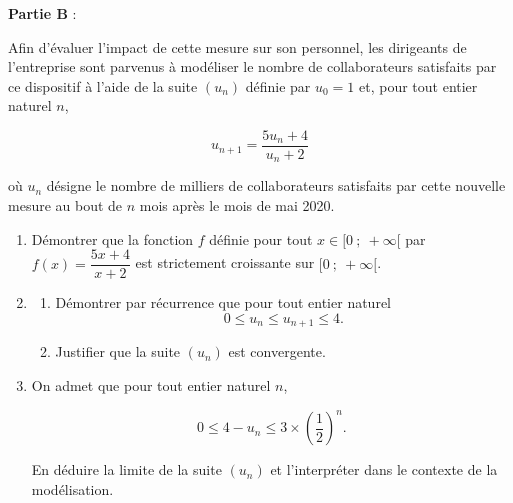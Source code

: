 \documentclass[10pt]{article}
\begin{document}
\bigskip

\textbf{Partie B }:

\medskip

Afin d'évaluer l'impact de cette mesure sur son personnel, les dirigeants de l'entreprise sont parvenus à modéliser le nombre de collaborateurs satisfaits par ce dispositif à l'aide de la suite 
$\left(u_n\right)$ définie par $u_0 = 1$ et, pour tout entier naturel $n$,

\[u_{n+1}  = \dfrac{5u_n + 4}{u_n + 2}\]

où $u_n$ désigne le nombre de milliers de collaborateurs satisfaits par cette nouvelle mesure au bout de $n$ mois après le mois de mai 2020.

\medskip

\begin{enumerate}
\item Démontrer que la fonction $f$ définie pour tout $x \in  [0~;~ +\infty[$ par $f(x) = \dfrac{5x+4}{x+2}$ est 
strictement croissante sur $[0~;~+ \infty[$.
\item 
	\begin{enumerate}
		\item Démontrer par récurrence que pour tout entier naturel 
		\[0 \leqslant u_n \leqslant u_{n+1}  \leqslant  4.\]
		
		\item Justifier que la suite $\left(u_n\right)$ est convergente.
	\end{enumerate}
\item On admet que pour tout entier naturel $n$,

\[0  \leqslant 4 - u_n \leqslant 3 \times \left(\dfrac{1}{2}\right)^n.\]

En déduire la limite de la suite $\left(u_n\right)$ et l'interpréter dans le contexte de la modélisation.
\end{enumerate}

\bigskip
\end{document}
